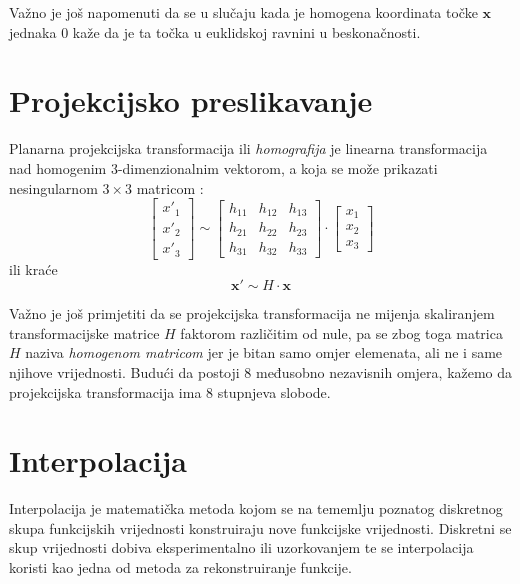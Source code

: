 Važno je još napomenuti da se u slučaju kada je homogena koordinata točke $\mathbf{x}$ jednaka $0$ kaže da je ta točka u euklidskoj ravnini u beskonačnosti.

\section{Projekcijsko preslikavanje}

Planarna projekcijska transformacija ili \textit{homografija} je linearna transformacija nad homogenim 3-dimenzionalnim vektorom, a koja se može prikazati nesingularnom $3 \times 3$ matricom \citep{Hartley2004}:
\begin{equation}
	\label{eq:transLong}
	\left[\begin{matrix}
		x'_1 \\
		x'_2 \\
		x'_3
	\end{matrix}
	\right] \sim \left[\begin{matrix}
		h_{11} & h_{12} & h_{13} \\
		h_{21} & h_{22} & h_{23} \\
		h_{31} & h_{32} & h_{33}
	\end{matrix}
	\right]
	\cdot
	\left[
	\begin{matrix}
		x_1 \\
		x_2 \\
		x_3
	\end{matrix}
	\right]
\end{equation}
ili kraće
\begin{equation}
	\mathbf{x'} \sim H \cdot \mathbf{x}
	\label{eq:transShort}
\end{equation}

Važno je još primjetiti da se projekcijska transformacija ne mijenja skaliranjem transformacijske matrice $H$ faktorom različitim od nule, pa se zbog toga matrica $H$ naziva \textit{homogenom matricom} jer je bitan samo omjer elemenata, ali ne i same njihove vrijednosti. Budući da postoji 8 međusobno nezavisnih omjera, kažemo da projekcijska transformacija ima 8 stupnjeva slobode.

\section{Interpolacija}

Interpolacija je matematička metoda kojom se na tememlju poznatog diskretnog skupa funkcijskih vrijednosti konstruiraju nove funkcijske vrijednosti. Diskretni se skup vrijednosti dobiva eksperimentalno ili uzorkovanjem te se interpolacija koristi kao jedna od metoda za rekonstruiranje funkcije. \citep{_interpolation_2013}

